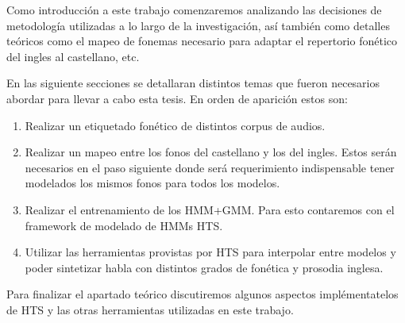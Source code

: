 Como introducción a este trabajo comenzaremos analizando las decisiones de metodología utilizadas a lo largo de la investigación, así también como detalles teóricos como el mapeo de fonemas necesario para adaptar el repertorio fonético del ingles al castellano, etc.

En las siguiente secciones se detallaran distintos temas que fueron necesarios abordar para llevar a cabo esta tesis. En orden de aparición estos son:

\begin{enumerate}
\item Realizar un etiquetado fonético de distintos corpus de audios.

\item Realizar un mapeo entre los fonos del castellano y los del ingles. Estos serán necesarios en el paso siguiente donde será requerimiento indispensable tener modelados los mismos fonos para todos los modelos.

\item Realizar el entrenamiento de los HMM+GMM. Para esto contaremos con el framework de modelado de HMMs HTS. 

\item Utilizar las herramientas provistas por HTS para interpolar entre modelos y poder sintetizar habla con distintos grados de fonética y prosodia inglesa.

\end{enumerate}

Para finalizar el apartado teórico discutiremos algunos aspectos implémentatelos de HTS y las otras herramientas utilizadas en este trabajo.
